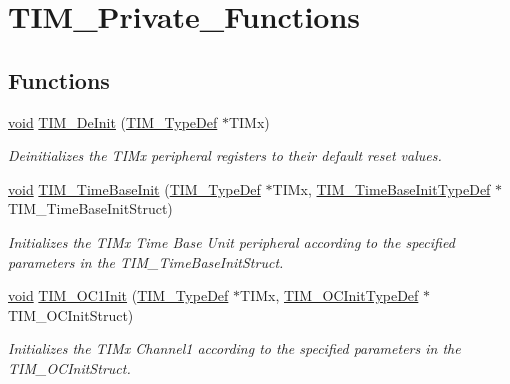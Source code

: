 \hypertarget{group___t_i_m___private___functions}{}\section{T\+I\+M\+\_\+\+Private\+\_\+\+Functions}
\label{group___t_i_m___private___functions}
\subsection*{Functions}
\begin{DoxyCompactItemize}
\item 
\hyperlink{usb__devapi_8h_afabf60e7f57651d6d595a02c75f07cd0}{void} \hyperlink{group___t_i_m___private___functions_ga1659cc0ce503ac151568e0c7c02b1ba5}{T\+I\+M\+\_\+\+De\+Init} (\hyperlink{struct_t_i_m___type_def}{T\+I\+M\+\_\+\+Type\+Def} $\ast$T\+I\+Mx)
\begin{DoxyCompactList}\small\item\em Deinitializes the T\+I\+Mx peripheral registers to their default reset values. \end{DoxyCompactList}\item 
\hyperlink{usb__devapi_8h_afabf60e7f57651d6d595a02c75f07cd0}{void} \hyperlink{group___t_i_m___private___functions_ga83fd58c9416802d9638bbe1715c98932}{T\+I\+M\+\_\+\+Time\+Base\+Init} (\hyperlink{struct_t_i_m___type_def}{T\+I\+M\+\_\+\+Type\+Def} $\ast$T\+I\+Mx, \hyperlink{struct_t_i_m___time_base_init_type_def}{T\+I\+M\+\_\+\+Time\+Base\+Init\+Type\+Def} $\ast$T\+I\+M\+\_\+\+Time\+Base\+Init\+Struct)
\begin{DoxyCompactList}\small\item\em Initializes the T\+I\+Mx Time Base Unit peripheral according to the specified parameters in the T\+I\+M\+\_\+\+Time\+Base\+Init\+Struct. \end{DoxyCompactList}\item 
\hyperlink{usb__devapi_8h_afabf60e7f57651d6d595a02c75f07cd0}{void} \hyperlink{group___t_i_m___private___functions_gafcdb6ff00158862aef7fed5e7a554a3e}{T\+I\+M\+\_\+\+O\+C1\+Init} (\hyperlink{struct_t_i_m___type_def}{T\+I\+M\+\_\+\+Type\+Def} $\ast$T\+I\+Mx, \hyperlink{struct_t_i_m___o_c_init_type_def}{T\+I\+M\+\_\+\+O\+C\+Init\+Type\+Def} $\ast$T\+I\+M\+\_\+\+O\+C\+Init\+Struct)
\begin{DoxyCompactList}\small\item\em Initializes the T\+I\+Mx Channel1 according to the specified parameters in the T\+I\+M\+\_\+\+O\+C\+Init\+Struct. \end{DoxyCompactList}\item 

\end{DoxyCompactItemize}
